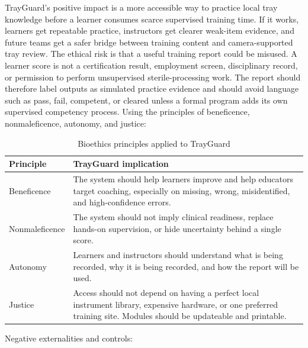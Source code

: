 \documentclass[10pt,a4paper]{article}
\begin{document}
TrayGuard's positive impact is a more accessible way to practice local tray
knowledge before a learner consumes scarce supervised training time. If it
works, learners get repeatable practice, instructors get clearer weak-item
evidence, and future teams get a safer bridge between training content and
camera-supported tray review.
The ethical risk is that a useful training report could be misused. A learner
score is not a certification result, employment screen, disciplinary record, or
permission to perform unsupervised sterile-processing work. The report should
therefore label outputs as simulated practice evidence and should avoid
language such as pass, fail, competent, or cleared unless a formal program adds
its own supervised competency process.
Using the principles of beneficence, nonmaleficence, autonomy, and justice:
\begin{table}[H]
\centering
\caption{Bioethics principles applied to TrayGuard}
\label{tab:bioethics-principles-applied-to-trayguard}
\small\renewcommand{\arraystretch}{1.2}\setlength{\tabcolsep}{4pt}
\begin{tabularx}{\textwidth}{|>{\raggedright\arraybackslash}X|>{\raggedright\arraybackslash}X|}
\hline
Principle & TrayGuard implication \\
\hline
Beneficence & The system should help learners improve and help educators target coaching, especially on missing, wrong, misidentified, and high-confidence errors. \\
\hline
Nonmaleficence & The system should not imply clinical readiness, replace hands-on supervision, or hide uncertainty behind a single score. \\
\hline
Autonomy & Learners and instructors should understand what is being recorded, why it is being recorded, and how the report will be used. \\
\hline
Justice & Access should not depend on having a perfect local instrument library, expensive hardware, or one preferred training site. Modules should be updateable and printable. \\
\hline
\end{tabularx}
\end{table}
Negative externalities and controls:
\end{document}
